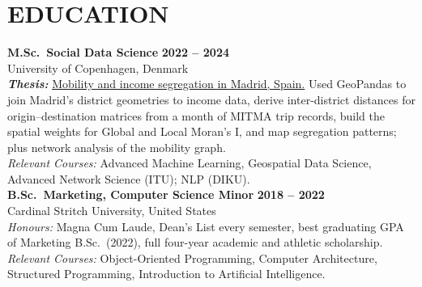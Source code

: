\documentclass{resume}
\begin{document}
\section{EDUCATION}
\begin{content}
    {\bf M.Sc.\ Social Data Science} \hfill {\bf 2022 -- 2024} \\
    University of Copenhagen, Denmark \\
    {\bf \em Thesis:} {\href{https://github.com/carobs9/segregation-madrid}{Mobility and income segregation in Madrid, Spain.}} {\small Used GeoPandas to join Madrid's district geometries to income data, derive inter-district distances for origin--destination matrices from a month of MITMA trip records, build the spatial weights for Global and Local Moran's I, and map segregation patterns; plus network analysis of the mobility graph.}  \\
    {\small {\em Relevant Courses:} Advanced Machine Learning, Geospatial Data Science, Advanced Network Science (ITU); NLP (DIKU).} \\[0.3em]
    {\bf B.Sc.\ Marketing, Computer Science Minor} \hfill {\bf 2018 -- 2022} \\
    Cardinal Stritch University, United States \\
    {\small {\em Honours:} Magna Cum Laude, Dean's List every semester, best graduating GPA of Marketing B.Sc.\ (2022), full four-year academic and athletic scholarship.} \\
    {\small {\em Relevant Courses:} Object-Oriented Programming, Computer Architecture, Structured Programming, Introduction to Artificial Intelligence.}
\end{content}

\end{document}

